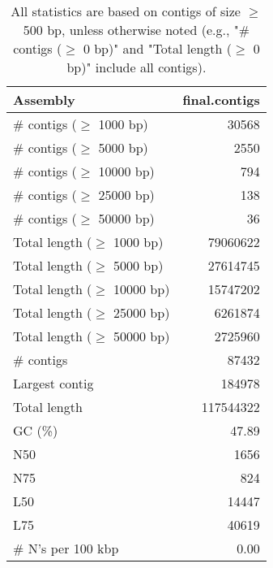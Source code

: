 \documentclass[12pt,a4paper]{article}
\begin{document}
\begin{table}[ht]
\begin{center}
\caption{All statistics are based on contigs of size $\geq$ 500 bp, unless otherwise noted (e.g., "\# contigs ($\geq$ 0 bp)" and "Total length ($\geq$ 0 bp)" include all contigs).}
\begin{tabular}{|l*{1}{|r}|}
\hline
Assembly & final.contigs \\ \hline
\# contigs ($\geq$ 1000 bp) & 30568 \\ \hline
\# contigs ($\geq$ 5000 bp) & 2550 \\ \hline
\# contigs ($\geq$ 10000 bp) & 794 \\ \hline
\# contigs ($\geq$ 25000 bp) & 138 \\ \hline
\# contigs ($\geq$ 50000 bp) & 36 \\ \hline
Total length ($\geq$ 1000 bp) & 79060622 \\ \hline
Total length ($\geq$ 5000 bp) & 27614745 \\ \hline
Total length ($\geq$ 10000 bp) & 15747202 \\ \hline
Total length ($\geq$ 25000 bp) & 6261874 \\ \hline
Total length ($\geq$ 50000 bp) & 2725960 \\ \hline
\# contigs & 87432 \\ \hline
Largest contig & 184978 \\ \hline
Total length & 117544322 \\ \hline
GC (\%) & 47.89 \\ \hline
N50 & 1656 \\ \hline
N75 & 824 \\ \hline
L50 & 14447 \\ \hline
L75 & 40619 \\ \hline
\# N's per 100 kbp & 0.00 \\ \hline
\end{tabular}
\end{center}
\end{table}
\end{document}
